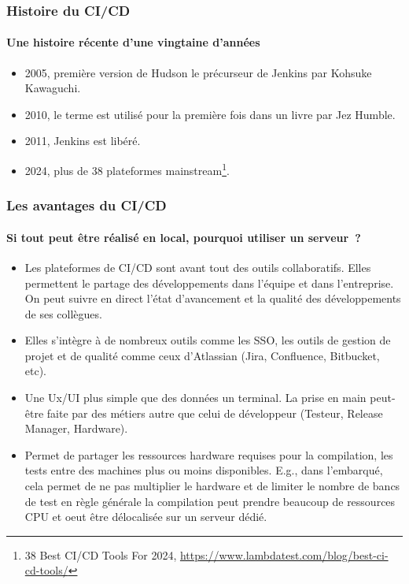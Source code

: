 \documentclass{beamer}
\begin{document}
    \begin{frame}
        \frametitle{Histoire du CI/CD}
        \framesubtitle{Une histoire récente d'une vingtaine d'années}
        \transdissolve
        \begin{itemize}
            \item 2005, première version de Hudson le précurseur de Jenkins par Kohsuke Kawaguchi.
            \item 2010, le terme  est utilisé pour la première fois dans un livre par Jez Humble.
            \item 2011, Jenkins est libéré.
            \item 2024, plus de 38 plateformes mainstream\footnote{38 Best CI/CD Tools For 2024, \url{https://www.lambdatest.com/blog/best-ci-cd-tools/}}.
        \end{itemize}
    \end{frame}

    \begin{frame}
        \frametitle{Les avantages du CI/CD}
        \framesubtitle{Si tout peut être réalisé en local, pourquoi utiliser un serveur~?}
        \transdissolve
        \begin{itemize}
            \item Les plateformes de CI/CD sont avant tout des outils collaboratifs.
            Elles permettent le partage des développements dans l'équipe et dans l'entreprise.
            On peut suivre en direct l'état d'avancement et la qualité des développements de ses collègues.
            \item Elles s'intègre à de nombreux outils comme les SSO, les outils de gestion de projet et de qualité comme ceux d'Atlassian (Jira, Confluence, Bitbucket, etc).
            \item Une Ux/UI plus simple que des données un terminal.
            La prise en main peut-être faite par des métiers autre que celui de développeur (Testeur, Release Manager, Hardware).
            \item Permet de partager les ressources hardware requises pour la compilation, les tests entre des machines plus ou moins disponibles.
            E.g., dans l'embarqué, cela permet de ne pas multiplier le hardware et de limiter le nombre de bancs de test en règle générale la compilation peut prendre beaucoup de ressources CPU et oeut être délocalisée sur un serveur dédié.
        \end{itemize}
    \end{frame}
\end{document}
